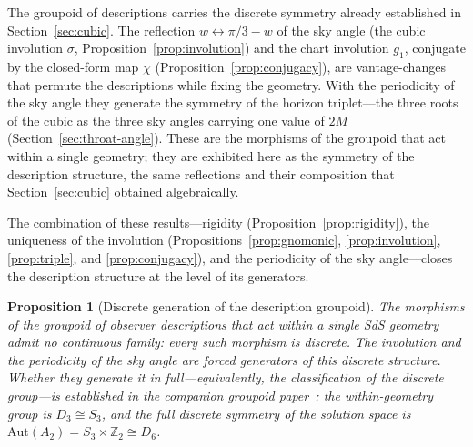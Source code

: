 \documentclass[11pt,a4paper]{article}
\newtheorem{proposition}[theorem]{Proposition}
\theoremstyle{definition}
\begin{document}
The groupoid of descriptions carries the discrete symmetry already established in Section~\ref{sec:cubic}. The reflection $w\leftrightarrow\pi/3-w$ of the sky angle (the cubic involution $\sigma$, Proposition~\ref{prop:involution}) and the chart involution $g_{1}$, conjugate by the closed-form map $\chi$ (Proposition~\ref{prop:conjugacy}), are vantage-changes that permute the descriptions while fixing the geometry. With the periodicity of the sky angle they generate the symmetry of the horizon triplet---the three roots of the cubic as the three sky angles carrying one value of $2M$ (Section~\ref{sec:throat-angle}). These are the morphisms of the groupoid that act within a single geometry; they are exhibited here as the symmetry of the description structure, the same reflections and their composition that Section~\ref{sec:cubic} obtained algebraically.

The combination of these results---rigidity (Proposition~\ref{prop:rigidity}), the uniqueness of the involution (Propositions~\ref{prop:gnomonic}, \ref{prop:involution}, \ref{prop:triple}, and \ref{prop:conjugacy}), and the periodicity of the sky angle---closes the description structure at the level of its generators.

\begin{proposition}[Discrete generation of the description groupoid]\label{prop:morphism-generation}
The morphisms of the groupoid of observer descriptions that act within a single SdS geometry admit no continuous family: every such morphism is discrete. The involution and the periodicity of the sky angle are forced generators of this discrete structure. Whether they generate it in full---equivalently, the classification of the discrete group---is established in the companion groupoid paper~\cite{JanzenGroupoid}: the within-geometry group is $D_{3}\cong S_{3}$, and the full discrete symmetry of the solution space is $\mathrm{Aut}(A_{2})=S_{3}\times\mathbb{Z}_{2}\cong D_{6}$.
\end{proposition}
\end{document}
